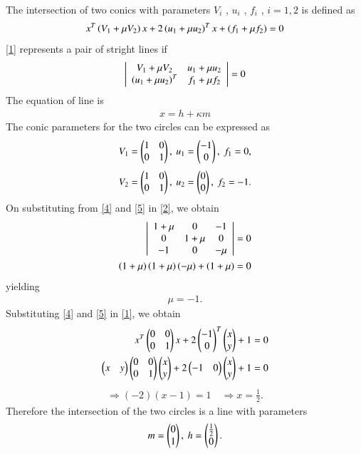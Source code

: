 \documentclass[journal]{IEEEtran}
\begin{document}
The intersection of two conics with parameters $V_i$ , $u_i$ , $f_i$ , $i = 1, 2$ is defined as
\begin{align}
      x^T\left(V_1+\mu V_2\right)x+2\left(u_1+\mu u_2\right)^Tx+\left(f_1+\mu f_2\right)=0 \label{1}
\end{align}
 \eqref{1} represents a pair of stright lines if 
\begin{align}
\left| \begin{array}{cc}
V_1+\mu V_2 & u_1+\mu u_2 \\
\left(u_1+\mu u_2\right)^T & f_1+\mu f_2
\end{array} \right| =0 \label{2}
\end{align}
The equation of line is
\begin{align}
x=h+\kappa m \label{3}
\end{align}
The conic parameters for the two circles can be expressed as
 \begin{align}
V_1 = \begin{pmatrix}1 & 0 \\ 0 & 1\end{pmatrix}, \ u_1 = \begin{pmatrix} -1 \\ 0\end{pmatrix}, \ f_1 = 0, \label{4}
 \end{align}
 \begin{align}
V_2 = \begin{pmatrix}1 & 0 \\ 0 & 1\end{pmatrix}, \ u_2 = \begin{pmatrix}0 \\ 0\end{pmatrix}, \ f_2 = -1. \label{5}
 \end{align}
On substituting from \eqref{4} and \eqref{5} in \eqref{2}, we obtain
\begin{align}
\left| \begin{array}{ccc}
1 + \mu & 0 & -1 \\ 0 & 1 + \mu & 0 \\ -1 & 0 & -\mu 
\end{array} \right| = 0 \label{6}
\\
 \left(1+\mu\right) \left(1+\mu\right) \left(-\mu\right)+\left(1+\mu\right) =0 \label{7}
  \end{align}
yielding
 \begin{align}
\mu = -1. \label{8}
 \end{align}
Substituting \eqref{4} and \eqref{5} in \eqref{1}, we obtain
 \begin{align}
x^T \begin{pmatrix} 0 & 0 \\ 0 & 1\end{pmatrix} x + 2 \begin{pmatrix} -1 \\ 0\end{pmatrix}^T \begin{pmatrix} x \\ y\end{pmatrix} + 1 = 0 \\  
 \begin{pmatrix}x & y\end{pmatrix} \begin{pmatrix}0 & 0 \\ 0 & 1\end{pmatrix} \begin{pmatrix}x \\ y\end{pmatrix}+2 \begin{pmatrix}-1 & 0\end{pmatrix} \begin{pmatrix}x \\ y\end{pmatrix}+1=0 \label{10}
 \end{align}
 \begin{align}
\Rightarrow (-2)(x-1) = 1 \quad \Rightarrow x = \frac{1}{2}. \label{11}
 \end{align}
Therefore the intersection of the two circles is a line with parameters
 \begin{align}
m = \begin{pmatrix}0 \\ 1\end{pmatrix}, \ h = \begin{pmatrix}\frac{1}{2} \\ 0\end{pmatrix}. \label{12}
 \end{align}
\end{document}
